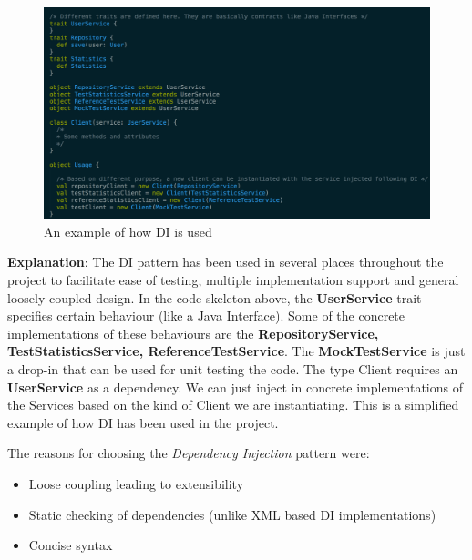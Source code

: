 \begin{figure}[H]
  \centering
    \includegraphics[width=520px]{figures/di.png}
  \caption{An example of how DI is used}
\end{figure}
\noindent

\noindent
\textbf{Explanation}: The DI pattern has been used in several places throughout the project to facilitate ease of testing, multiple implementation support and general loosely coupled design. In the code skeleton above, the \textbf{UserService} trait specifies certain behaviour (like a Java Interface). Some of the concrete implementations of these behaviours are the \textbf{RepositoryService, TestStatisticsService, ReferenceTestService}. The \textbf{MockTestService} is just a drop-in that can be used for unit testing the code. The type Client requires an \textbf{UserService} as a dependency. We can just inject in concrete implementations of the Services based on the kind of Client we are instantiating. This is a simplified example of how DI has been used in the project.
\bigskip

\noindent
The reasons for choosing the \textit{Dependency Injection} pattern were:
\begin{itemize}
\item Loose coupling leading to extensibility
\item Static checking of dependencies (unlike XML based DI implementations)
\item Concise syntax
\end{itemize}